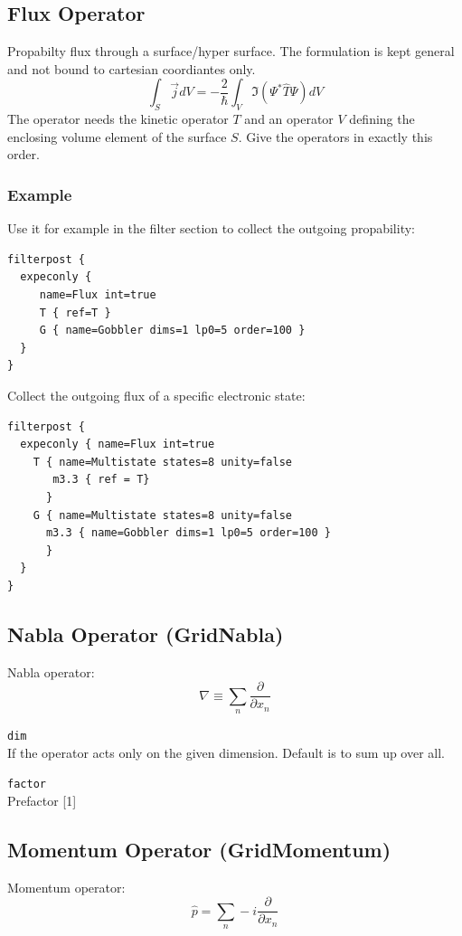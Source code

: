 \documentclass[a4paper,12pt]{scrbook}
\newcommand{\option}[2]{\item \texttt{#1}\\ #2}
\begin{document}
\subsection{Flux Operator}
Propabilty flux through a surface/hyper surface. The formulation
is kept general and not bound to cartesian coordiantes only.
\begin{equation}
 \int_S \vec{j} dV = -\frac{2}{\hbar} \int_V \Im(\Psi^* \hat T \Psi)dV
\end{equation}
The operator needs the kinetic operator $T$ and an operator $V$
defining the enclosing volume element of the surface $S$.
Give the operators in exactly this order.

\subsubsection*{Example}
Use it for example in the filter section to collect the outgoing propability:
\begin{verbatim}
filterpost {
  expeconly {
     name=Flux int=true
     T { ref=T }
     G { name=Gobbler dims=1 lp0=5 order=100 }
  }
}
\end{verbatim}
Collect the outgoing flux of a specific electronic state:
\begin{verbatim}
filterpost {
  expeconly { name=Flux int=true
    T { name=Multistate states=8 unity=false
       m3.3 { ref = T}
      }
    G { name=Multistate states=8 unity=false
      m3.3 { name=Gobbler dims=1 lp0=5 order=100 }
      }
  }
}
\end{verbatim}

\subsection{Nabla Operator (GridNabla)}
Nabla operator:
\begin{equation}
 \nabla  \equiv \sum_n \frac{\partial}{\partial x_n}
\end{equation}

\begin{options}
 \option{dim}{If the operator acts only on the given dimension. Default is to sum up over all.}
 \option{factor}{Prefactor [1]}
\end{options}

\subsection{Momentum Operator (GridMomentum)}
Momentum operator:
\begin{equation}
 \hat p = \sum_n -i \frac{\partial}{\partial x_n}
\end{equation}
\end{document}

